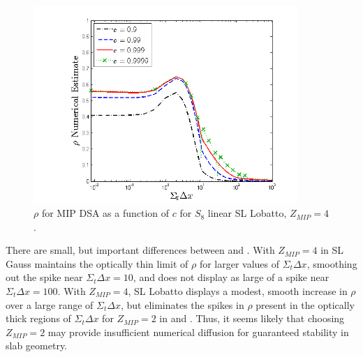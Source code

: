 \begin{figure}[!htp]
\centering
\includegraphics[width=10cm]{chapter4_acceleration/Const_4_Constant_XS_c_comparions_MIP_Lobatto.png}
\caption{$\rho$ for MIP DSA as a function of $c$  for  $S_8$  linear SL Lobatto, $Z_{MIP}=4$.}
\label{fig:mip_lobatto_as_fun_c_z4}
\end{figure}

There are small, but important differences between  and  .  With $Z_{MIP}=4$ in  SL Gauss maintains the optically thin limit of $\rho$ for larger values of $\Sigma_t \Delta x$, smoothing out the spike near $\Sigma_t \Delta x=10$, and does not display as large of a spike near $\Sigma_t \Delta x =100$.
With $Z_{MIP}=4$, SL Lobatto displays a modest, smooth increase in $\rho$ over a large range of $\Sigma_t \Delta x$, but eliminates the spikes in $\rho$ present in the optically thick regions of $\Sigma_t \Delta x$ for $Z_{MIP}=2$ in  and .
Thus, it seems likely that choosing $Z_{MIP}=2$ may provide insufficient numerical diffusion for guaranteed stability in slab geometry. 


